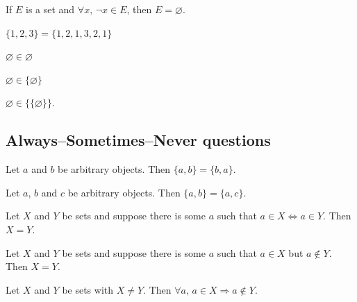 \begin{chapex}
If $E$ is a set and $\forall x,\, \neg x \in E$, then $E = \varnothing$.
\end{chapex}

\begin{chapex}
$\{ 1, 2, 3 \} = \{ 1, 2, 1, 3, 2, 1 \}$
\end{chapex}

\begin{chapex}
$\varnothing \in \varnothing$
\end{chapex}

\begin{chapex}
$\varnothing \in \{ \varnothing \}$
\end{chapex}

\begin{chapex}
\label{cqSetsTFEnd}
$\varnothing \in \{ \{ \varnothing \} \}$.
\end{chapex}

\subsection*{Always--Sometimes--Never questions}


\begin{chapex} %
\label{cqSetsASNBegin}
Let $a$ and $b$ be arbitrary objects. Then $\{ a, b \} = \{ b, a \}$.
\end{chapex}

\begin{chapex} %
Let $a$, $b$ and $c$ be arbitrary objects. Then $\{ a, b \} = \{ a, c \}$.
\end{chapex}

\begin{chapex} %
Let $X$ and $Y$ be sets and suppose there is some $a$ such that $a \in X \Leftrightarrow a \in Y$. Then $X = Y$.
\end{chapex}

\begin{chapex} %
Let $X$ and $Y$ be sets and suppose there is some $a$ such that $a \in X$ but $a \not\in Y$. Then $X = Y$.
\end{chapex}

\begin{chapex} %
Let $X$ and $Y$ be sets with $X \ne Y$. Then $\forall a,\, a \in X \Rightarrow a \not\in Y$.
\end{chapex}

